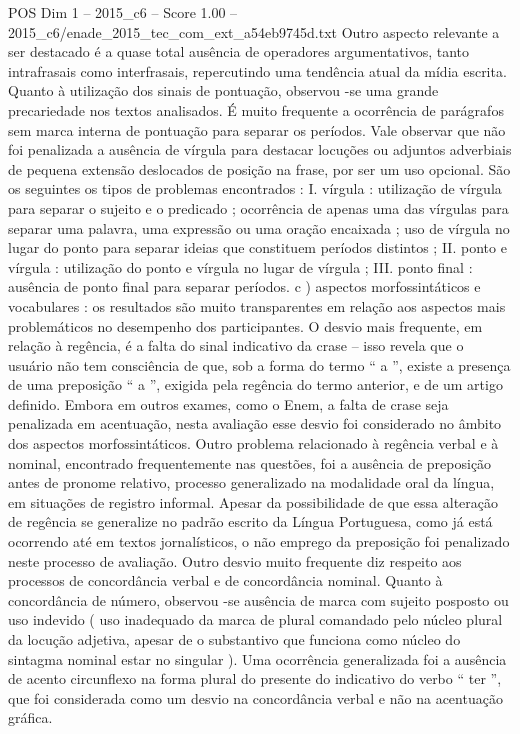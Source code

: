 \begin{textsample}{POS Dim 1 – 2015\_c6 – Score 1.00 – 2015\_c6/enade\_2015\_tec\_com\_ext\_a54eb9745d.txt}
Outro aspecto relevante a ser destacado é a quase total ausência de operadores argumentativos, tanto intrafrasais como interfrasais, repercutindo uma tendência atual da mídia escrita.
Quanto à utilização dos sinais de pontuação, observou -se uma grande precariedade nos textos analisados.
É muito frequente a ocorrência de parágrafos sem marca interna de pontuação para separar os períodos.
Vale observar que não foi penalizada a ausência de vírgula para destacar locuções ou adjuntos adverbiais de pequena extensão deslocados de posição na frase, por ser um uso opcional.
São os seguintes os tipos de problemas encontrados : I. vírgula : utilização de vírgula para separar o sujeito e o predicado ; ocorrência de apenas uma das vírgulas para separar uma palavra, uma expressão ou uma oração encaixada ; uso de vírgula no lugar do ponto para separar ideias que constituem períodos distintos ; II. ponto e vírgula : utilização do ponto e vírgula no lugar de vírgula ; III. ponto final : ausência de ponto final para separar períodos. c ) aspectos morfossintáticos e vocabulares : os resultados são muito transparentes em relação aos aspectos mais problemáticos no desempenho dos participantes.
O desvio mais frequente, em relação à regência, é a falta do sinal indicativo da crase – isso revela que o usuário não tem consciência de que, sob a forma do termo “ a ”, existe a presença de uma preposição “ a ”, exigida pela regência do termo anterior, e de um artigo definido.
Embora em outros exames, como o Enem, a falta de crase seja penalizada em acentuação, nesta avaliação esse desvio foi considerado no âmbito dos aspectos morfossintáticos.
Outro problema relacionado à regência verbal e à nominal, encontrado frequentemente nas questões, foi a ausência de preposição antes de pronome relativo, processo generalizado na modalidade oral da língua, em situações de registro informal.
Apesar da possibilidade de que essa alteração de regência se generalize no padrão escrito da Língua Portuguesa, como já está ocorrendo até em textos jornalísticos, o não emprego da preposição foi penalizado neste processo de avaliação.
Outro desvio muito frequente diz respeito aos processos de concordância verbal e de concordância nominal.
Quanto à concordância de número, observou -se ausência de marca com sujeito posposto ou uso indevido ( uso inadequado da marca de plural comandado pelo núcleo plural da locução adjetiva, apesar de o substantivo que funciona como núcleo do sintagma nominal estar no singular ).
Uma ocorrência generalizada foi a ausência de acento circunflexo na forma plural do presente do indicativo do verbo “ ter ”, que foi considerada como um desvio na concordância verbal e não na acentuação gráfica.

\end{textsample}
